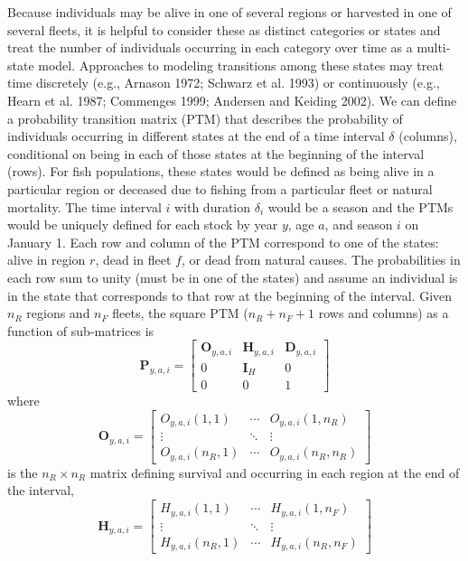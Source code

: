 \documentclass[
]{article}
\begin{document}
Because individuals may be alive in one of several regions or harvested in one of several fleets, it is helpful to consider these as distinct categories or states and treat the number of individuals occurring in each category over time as a multi-state model. Approaches to modeling transitions among these states may treat time discretely (e.g., Arnason 1972; Schwarz et al. 1993) or continuously (e.g., Hearn et al. 1987; Commenges 1999; Andersen and Keiding 2002). We can define a probability transition matrix (PTM) that describes the probability of individuals occurring in different states at the end of a time interval \(\delta\) (columns), conditional on being in each of those states at the beginning of the interval (rows). For fish populations, these states would be defined as being alive in a particular region or deceased due to fishing from a particular fleet or natural mortality. The time interval \(i\) with duration \(\delta_i\) would be a season and the PTMs would be uniquely defined for each stock by year \(y\), age \(a\), and season \(i\) on January 1. Each row and column of the PTM correspond to one of the states: alive in region \(r\), dead in fleet \(f\), or dead from natural causes. The probabilities in each row sum to unity (must be in one of the states) and assume an individual is in the state that corresponds to that row at the beginning of the interval. Given \(n_R\) regions and \(n_F\) fleets, the square PTM (\(n_R + n_F + 1\) rows and columns) as a function of sub-matrices is
\begin{equation}\label{eq:ptm}
  \mathbf{P}_{y,a,i} = \begin{bmatrix}
    \mathbf{O}_{y,a,i} & \mathbf{H}_{y,a,i} & \mathbf{D}_{y,a,i} \\
    0 & \mathbf{I}_{H} & 0\\
    0 & 0 & 1
  \end{bmatrix}
\end{equation}
where
\begin{equation*}
  \mathbf{O}_{y,a,i} = 
  \begin{bmatrix}
    O_{y,a,i}(1,1) & \cdots & O_{y,a,i}(1,n_R) \\
    \vdots & \ddots & \vdots \\
    O_{y,a,i}(n_R,1) & \cdots & O_{y,a,i}(n_R,n_R)
  \end{bmatrix}
\end{equation*}
is the \(n_R \times n_R\) matrix defining survival and occurring in each region at the end of the interval,
\begin{equation*} 
  \mathbf{H}_{y,a,i} = 
  \begin{bmatrix}
    H_{y,a,i}(1,1) & \cdots & H_{y,a,i}(1,n_F) \\
    \vdots & \ddots & \vdots \\
    H_{y,a,i}(n_R,1) & \cdots & H_{y,a,i}(n_R,n_F)
  \end{bmatrix}
\end{equation*}
\end{document}
